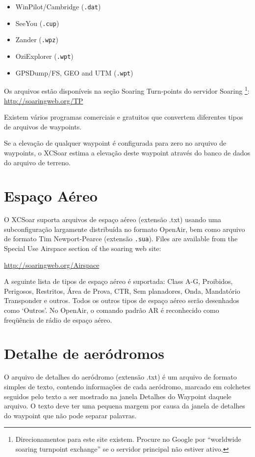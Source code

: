 \begin{itemize}
\item WinPilot/Cambridge (\verb|.dat|)
\item SeeYou (\verb|.cup|)
\item Zander (\verb|.wpz|)
\item OziExplorer (\verb|.wpt|)
\item GPSDump/FS, GEO and UTM (\verb|.wpt|)
\end{itemize}

Os arquivos estão disponíveis na seção Soaring Turn-points do servidor Soaring \footnote{Direcionamentos para este site existem.  Procure no Google por “worldwide soaring turnpoint exchange” se o servidor principal não estiver ativo.}: \url{http://soaringweb.org/TP}

Existem vários programas comerciais e gratuitos que convertem diferentes tipos de arquivos de waypoints.

Se a elevação de qualquer waypoint é configurada para zero no arquivo de waypoints, o XCSoar estima a elevação deste waypoint através do banco de dados do arquivo de terreno.

\section{Espaço Aéreo}

O XCSoar suporta arquivos de espaço aéreo (extensão .txt) usando uma subconfiguração largamente distribuída no formato OpenAir, bem como arquivo de formato Tim Newport-Pearce  (extensão \verb|.sua|). Files are available from the
Special Use Airspace section of the soaring web site:

\url{http://soaringweb.org/Airspace}

A seguinte lista de tipos de espaço aéreo é suportada: Class A-G, Proibidos, Perigosos, Restritos, Área de Prova, CTR, Sem planadores, Onda, Mandatório Transponder e outros.  Todos os outros tipos de espaço aéreo serão desenhados como ‘Outros’.  No OpenAir, o comando padrão AR é reconhecido como freqüência de rádio de espaço aéreo.

\section{Detalhe de aeródromos}\label{sec:airfield-details}

O arquivo de detalhes do aeródromo (extensão .txt) é um arquivo de formato simples de texto, contendo informações de cada aeródromo, marcado em colchetes seguidos pelo texto a ser mostrado na janela Detalhes do Waypoint daquele arquivo.  O texto deve ter uma pequena margem por causa da janela de detalhes do waypoint que não pode separar palavras.

